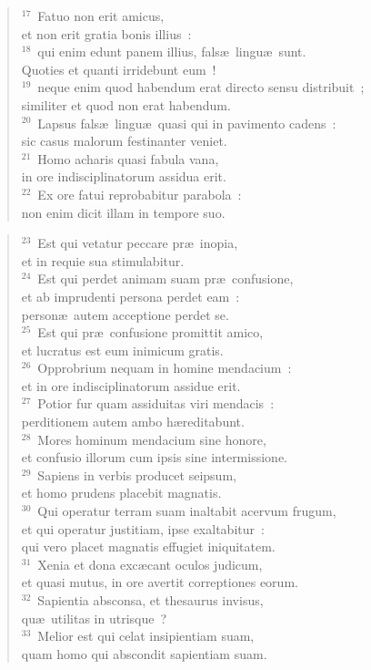 \begin{verse}
${}^{17}$~Fatuo non erit amicus,\\ et non erit gratia bonis illius~:\\
${}^{18}$~qui enim edunt panem illius, fals\ae\ lingu\ae\ sunt.\\ Quoties et quanti irridebunt eum~!\\
${}^{19}$~neque enim quod habendum erat directo sensu distribuit~;\\ similiter et quod non erat habendum.\\
${}^{20}$~Lapsus fals\ae\ lingu\ae\ quasi qui in pavimento cadens~:\\ sic casus malorum festinanter veniet.\\
${}^{21}$~Homo acharis quasi fabula vana,\\ in ore indisciplinatorum assidua erit.\\
${}^{22}$~Ex ore fatui reprobabitur parabola~:\\ non enim dicit illam in tempore suo.\end{verse}


\begin{verse}${}^{23}$~Est qui vetatur peccare pr\ae\ inopia,\\ et in requie sua stimulabitur.\\
${}^{24}$~Est qui perdet animam suam pr\ae\ confusione,\\ et ab imprudenti persona perdet eam~:\\ person\ae\ autem acceptione perdet se.\\
${}^{25}$~Est qui pr\ae\ confusione promittit amico,\\ et lucratus est eum inimicum gratis.\\
${}^{26}$~Opprobrium nequam in homine mendacium~:\\ et in ore indisciplinatorum assidue erit.\\
${}^{27}$~Potior fur quam assiduitas viri mendacis~:\\ perditionem autem ambo h\ae reditabunt.\\
${}^{28}$~Mores hominum mendacium sine honore,\\ et confusio illorum cum ipsis sine intermissione.\\
${}^{29}$~Sapiens in verbis producet seipsum,\\ et homo prudens placebit magnatis.\\
${}^{30}$~Qui operatur terram suam inaltabit acervum frugum,\\ et qui operatur justitiam, ipse exaltabitur~:\\ qui vero placet magnatis effugiet iniquitatem.\\
${}^{31}$~Xenia et dona exc\ae cant oculos judicum,\\ et quasi mutus, in ore avertit correptiones eorum.\\
${}^{32}$~Sapientia absconsa, et thesaurus invisus,\\ qu\ae\ utilitas in utrisque~?\\
${}^{33}$~Melior est qui celat insipientiam suam,\\ quam homo qui abscondit sapientiam suam.\end{verse}


